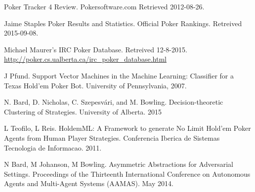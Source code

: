 \documentclass[twoside]{article}
\begin{document}
\begin{multicols}{2}
\begin{thebibliography}{99}
 Poker Tracker 4 Review. Pokersoftware.com Retrieved 2012-08-26.

 Jaime Staples Poker Results and Statistics. Official Poker Rankings. Retreived 2015-09-08.

 Michael Maurer's IRC Poker Database. Retreived 12-8-2015.
\url{http://poker.cs.ualberta.ca/irc_poker_database.html}

 J Pfund. Support Vector Machines in the Machine Learning: Classifier for a Texas Hold'em Poker Bot.  University of Pennsylvania, 2007.

 N. Bard, D. Nicholas, C. Szepesvári, and M. Bowling. Decision-theoretic Clustering of Strategies. University of Alberta. 2015

 L Teofilo, L Reis. HoldemML: A Framework to generate No Limit Hold’em Poker Agents from Human Player Strategies. Conferencia Iberica de Sistemas Tecnologia de Informacao. 2011.

 N Bard, M Johanson, M Bowling. Asymmetric Abstractions for Adversarial Settings. Proceedings of the Thirteenth International Conference on Autonomous Agents and Multi-Agent Systems (AAMAS). May 2014.
\end{thebibliography}


\end{multicols}
\end{document}
